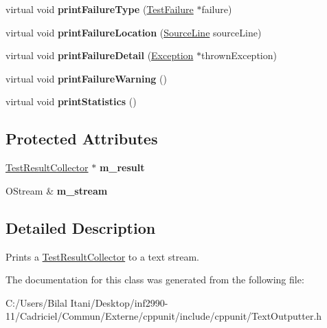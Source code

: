 \begin{DoxyCompactItemize}
\item 
virtual void {\bfseries print\+Failure\+Type} (\hyperlink{class_test_failure}{Test\+Failure} $\ast$failure)\hypertarget{class_text_outputter_a95c601c6a903700450d95e13db502247}{}\label{class_text_outputter_a95c601c6a903700450d95e13db502247}

\item 
virtual void {\bfseries print\+Failure\+Location} (\hyperlink{class_source_line}{Source\+Line} source\+Line)\hypertarget{class_text_outputter_a5ba7ad1968b180ce9593373718632af9}{}\label{class_text_outputter_a5ba7ad1968b180ce9593373718632af9}

\item 
virtual void {\bfseries print\+Failure\+Detail} (\hyperlink{class_exception}{Exception} $\ast$thrown\+Exception)\hypertarget{class_text_outputter_ae1a2ad2deebf4b12f803c59d867980f7}{}\label{class_text_outputter_ae1a2ad2deebf4b12f803c59d867980f7}

\item 
virtual void {\bfseries print\+Failure\+Warning} ()\hypertarget{class_text_outputter_a254f58361b8f5c59b60df1c007d9a438}{}\label{class_text_outputter_a254f58361b8f5c59b60df1c007d9a438}

\item 
virtual void {\bfseries print\+Statistics} ()\hypertarget{class_text_outputter_aeabfe5420c137b0a935c5b0acb45a6d8}{}\label{class_text_outputter_aeabfe5420c137b0a935c5b0acb45a6d8}

\end{DoxyCompactItemize}
\subsection*{Protected Attributes}
\begin{DoxyCompactItemize}
\item 
\hyperlink{class_test_result_collector}{Test\+Result\+Collector} $\ast$ {\bfseries m\+\_\+result}\hypertarget{class_text_outputter_a465e8c580e6f2db9ed021e1c44b95eb2}{}\label{class_text_outputter_a465e8c580e6f2db9ed021e1c44b95eb2}

\item 
O\+Stream \& {\bfseries m\+\_\+stream}\hypertarget{class_text_outputter_a947e16694e57297974e0f651d6298b80}{}\label{class_text_outputter_a947e16694e57297974e0f651d6298b80}

\end{DoxyCompactItemize}


\subsection{Detailed Description}
Prints a \hyperlink{class_test_result_collector}{Test\+Result\+Collector} to a text stream. 

The documentation for this class was generated from the following file\+:\begin{DoxyCompactItemize}
\item 
C\+:/\+Users/\+Bilal Itani/\+Desktop/inf2990-\/11/\+Cadriciel/\+Commun/\+Externe/cppunit/include/cppunit/Text\+Outputter.\+h\end{DoxyCompactItemize}

